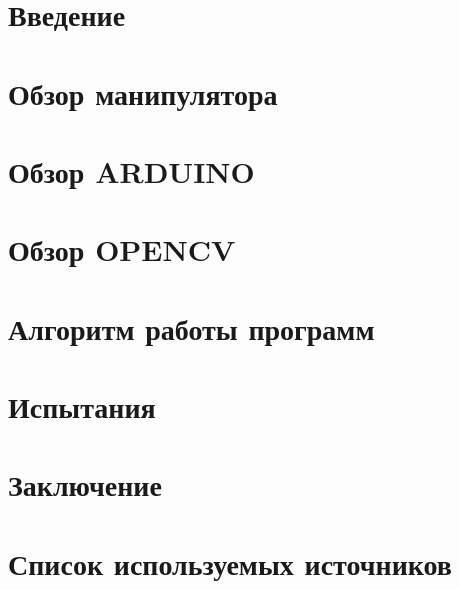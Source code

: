 


  
  
  

 \newpage
 \tableofcontents

 \newpage
 \setcounter{figure}{0}
 \section{Введение}
 
 \newpage
 \section{Обзор манипулятора}
 
 \newpage
 \setcounter{figure}{0}
 \section{Обзор ARDUINO}
 
 \newpage
 \setcounter{figure}{0}
 \section{Обзор OPENCV}
 
 \newpage
 \setcounter{figure}{0}
 \newpage
 \section{Алгоритм работы программ}
 
 \setcounter{figure}{0}
 \section{Испытания}
 
 \newpage
 \section{Заключение}
 
 \newpage
 \section*{Список используемых источников}
 
 
 \newpage
 